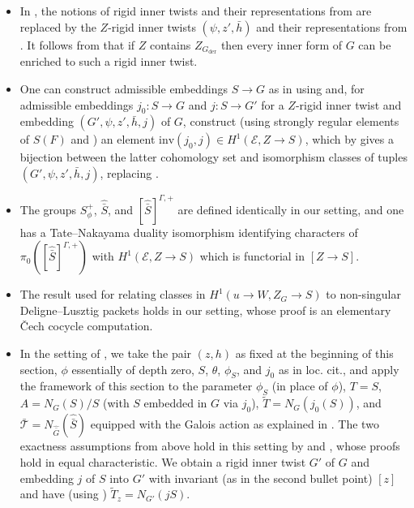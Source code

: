 \documentclass{amsart}
\theoremstyle{definition}
\theoremstyle{remark}
\begin{document}
\begin{itemize}
    \item{In \cite[\S 4.2]{Kal22}, the notions of rigid inner twists and their representations from \cite[\S 5.1]{kaletha16} are replaced by the $Z$-rigid inner twists $(\psi,z',\bar{h})$ and their representations from \cite[Definition 7.1 and Definition 7.9]{Dillery1}. It follows from \cite[Proposition 5.12]{Dillery1} that if $Z$ contains $Z_{G_{\text{der}}}$ then every inner form of $G$ can be enriched to such a rigid inner twist.}
    \item{One can construct admissible embeddings $S \to G$ as in \cite[\S 4.2, \S 4.4]{Kal22} using \cite[Lemma 6.2]{Dillery1} and, for admissible embeddings $j_{0} \colon S \to G$ and $j \colon S \to G'$ for a $Z$-rigid inner twist and embedding $(G',\psi,z',\bar{h},j)$ of $G$, construct (using strongly regular elements of $S(F)$ and \cite[\S 7.1]{Dillery1}) an element $\text{inv}(j_{0},j) \in H^{1}(\mathcal{E}, Z \to S)$, which by \cite[Proposition 7.7, Lemma 7.8]{Dillery1} gives a bijection between the latter cohomology set and isomorphism classes of tuples $(G',\psi,z',\bar{h},j)$, replacing \cite[(4.3)]{Kal22}.}
    \item{The groups $S_{\phi}^{+}$, $\widehat{\bar{S}}$, and $[\widehat{\bar{S}}]^{\Gamma,+}$ are defined identically in our setting, and one has a Tate--Nakayama duality isomorphism \cite[Corollary 7.11]{Dillery1} identifying characters of $\pi_{0}([\widehat{\bar{S}}]^{\Gamma,+})$ with $H^{1}(\mathcal{E}, Z \to S)$ which is functorial in $[Z \to S]$.}
    \item{The result \cite[Lemma E.1]{Kal22} used for relating classes in $H^{1}(u \to W, Z_{G} \to S)$ to non-singular Deligne--Lusztig packets holds in our setting, whose proof is an elementary \v{C}ech cocycle computation.}
    \item{In the setting of \cite[\S 4.5]{Kal22}, we take the pair $(z,h)$ as fixed at the beginning of this section, $\phi$ essentially of depth zero, $S$, $\theta$, $\phi_{S}$, and $j_{0}$ as in loc. cit., and apply the framework of this section to the parameter $\phi_{S}$ (in place of $\phi$), $T =S$, $A=N_{G}(S)/S$ (with $S$ embedded in $G$ via $j_{0}$), $\tilde{T} = N_{G}(j_{0}(S))$, and $\bar{\mathcal{T}} = N_{\widehat{\bar{G}}}(\widehat{\bar{S}})$ equipped with the Galois action as explained in \cite{Kal22}. The two exactness assumptions from above hold in this setting by \cite[Lemma 3.4.10]{Kal19} and \cite[Lemma 4.5.3]{Kal22}, whose proofs hold in equal characteristic. We obtain a rigid inner twist $G'$ of $G$ and embedding $j$ of $S$ into $G'$ with invariant (as in the second bullet point) $[z]$ and have (using \cite[Proposition 7.7]{Dillery1}) $\tilde{T}_{z} = N_{G'}(jS)$.}
\end{itemize}
\end{document}
